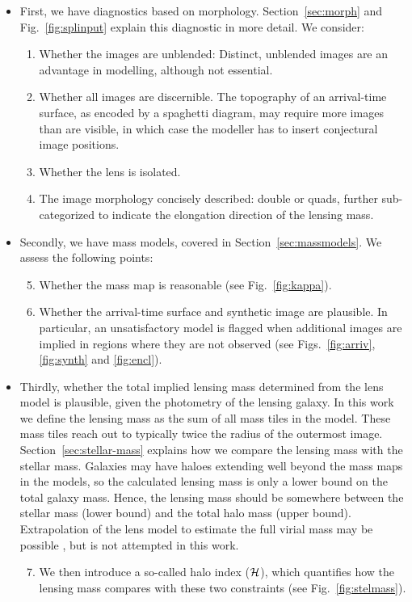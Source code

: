 \begin{itemize}
\item First, we have diagnostics based on morphology.
  Section~\ref{sec:morph} and Fig.~\ref{fig:splinput} explain
  this diagnostic in more detail. We consider:
\begin{enumerate}
\item Whether the images are unblended:  Distinct, unblended images are
  an advantage in modelling, although not essential.
\item Whether all images are discernible.  The topography of an
  arrival-time surface, as encoded by a spaghetti diagram, may require
  more images than are visible, in which case the modeller has to
  insert conjectural image positions.
\item Whether the lens is isolated.
\item The image morphology concisely described: double or quads,
  further sub-categorized to indicate the elongation direction of the
  lensing mass.
\end{enumerate}
\item Secondly, we have mass models, covered in Section~\ref{sec:massmodels}.
  We assess the following points:
\begin{enumerate}
\setcounter{enumi}{4}
\item Whether the mass map is reasonable (see Fig.~\ref{fig:kappa}).
\item Whether the arrival-time surface and synthetic image are
  plausible. In particular, an unsatisfactory model is flagged when 
  additional images are implied in regions
  where they are not observed (see Figs.~\ref{fig:arriv}, \ref{fig:synth} and \ref{fig:encl}).
\end{enumerate}
\item Thirdly, whether the total implied lensing mass determined from
  the lens model is plausible, given the photometry of the lensing
  galaxy.  In this work we define the lensing mass as the sum of all
  mass tiles in the model.  These mass tiles reach out to typically
  twice the radius of the outermost image.
  Section~\ref{sec:stellar-mass} explains how we compare the lensing
  mass with the stellar mass.  Galaxies may have haloes extending well
  beyond the mass maps in the models, so the calculated lensing mass
  is only a lower bound on the total galaxy mass.  Hence, the lensing
  mass should be somewhere between the stellar mass (lower bound) and
  the total halo mass (upper bound).  Extrapolation of the lens model
  to estimate the full virial mass may be possible
  \citep[cf.][]{2012MNRAS.424..104L}, but is not attempted in this
  work.
\begin{enumerate}
\setcounter{enumi}{6}
\item We then introduce a so-called halo index ($\mathcal{H}$), which
  quantifies how the lensing mass compares with these two
  constraints (see Fig.~\ref{fig:stelmass}).
\end{enumerate}
\end{itemize}






